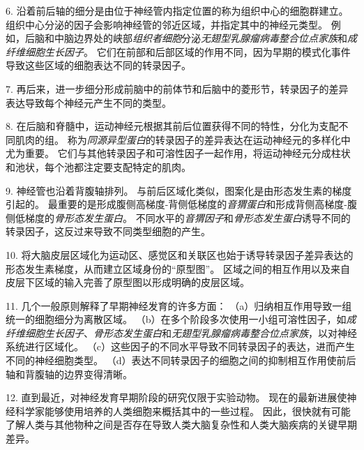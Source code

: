 6. 沿着前后轴的细分是由位于神经管内指定位置的称为组织中心的细胞群建立。
组织中心分泌的因子会影响神经管的邻近区域，并指定其中的神经元类型。
例如，后脑和中脑边界处的峡部\textit{组织者细胞}分泌\textit{无翅型乳腺瘤病毒整合位点家族}和\textit{成纤维细胞生长因子}。
它们在前部和后部区域的作用不同，因为早期的模式化事件导致这些区域的细胞表达不同的转录因子。


7. 再后来，进一步细分形成前脑中的前体节和后脑中的菱形节，转录因子的差异表达导致每个神经元产生不同的类型。 


8. 在后脑和脊髓中，运动神经元根据其前后位置获得不同的特性，分化为支配不同肌肉的组。
称为\textit{同源异型蛋白}的转录因子的差异表达在运动神经元的多样化中尤为重要。
它们与其他转录因子和可溶性因子一起作用，将运动神经元分成柱状和池状，每个池都注定要支配特定的肌肉。 


9. 神经管也沿着背腹轴排列。
与前后区域化类似，图案化是由形态发生素的梯度引起的。
最重要的是形成腹侧高梯度-背侧低梯度的\textit{音猬蛋白}和形成背侧高梯度-腹侧低梯度的\textit{骨形态发生蛋白}。
不同水平的\textit{音猬因子}和\textit{骨形态发生蛋白}诱导不同的转录因子，这反过来导致不同类型细胞的产生。


10. 将大脑皮层区域化为运动区、感觉区和关联区也始于诱导转录因子差异表达的形态发生素梯度，从而建立区域身份的“原型图”。
区域之间的相互作用以及来自皮层下区域的输入完善了原型图以形成明确的皮层区域。 


11. 几个一般原则解释了早期神经发育的许多方面： 
（a）归纳相互作用导致一组统一的细胞细分为离散区域。
（b）在多个阶段多次使用一小组可溶性因子，如\textit{成纤维细胞生长因子}、\textit{骨形态发生蛋白}和\textit{无翅型乳腺瘤病毒整合位点家族}，以对神经系统进行区域化。
（c）这些因子的不同水平导致不同转录因子的表达，进而产生不同的神经细胞类型。
（d）表达不同转录因子的细胞之间的抑制相互作用使前后轴和背腹轴的边界变得清晰。


12. 直到最近，对神经发育早期阶段的研究仅限于实验动物。
现在的最新进展使神经科学家能够使用培养的人类细胞来概括其中的一些过程。
因此，很快就有可能了解人类与其他物种之间是否存在导致人类大脑复杂性和人类大脑疾病的关键早期差异。

